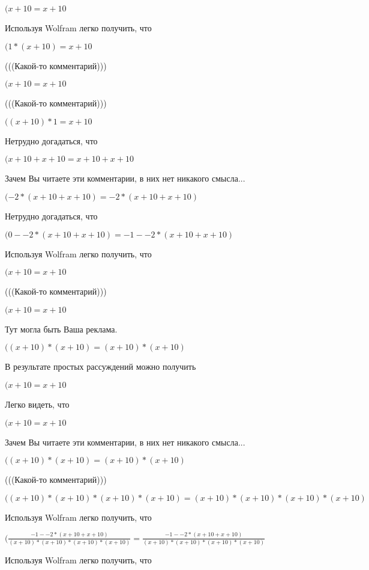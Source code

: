 \documentclass[12pt,a4paper,fleqn]{article}
\theoremstyle{definition}
\begin{document}
$( x  +  10  =  x  +  10 $

Используя Wolfram легко получить, что

$( 1  * ( x  +  10 ) =  x  +  10 $

(((Какой-то комментарий)))

$( x  +  10  =  x  +  10 $

(((Какой-то комментарий)))

$(( x  +  10 ) *  1  =  x  +  10 $

Нетрудно догадаться, что

$( x  +  10  +  x  +  10  =  x  +  10  +  x  +  10 $

Зачем Вы читаете эти комментарии, в них нет никакого смысла...

$( -2  * ( x  +  10  +  x  +  10 ) =  -2  * ( x  +  10  +  x  +  10 )$

Нетрудно догадаться, что

$( 0  -  -2  * ( x  +  10  +  x  +  10 ) =  -1  -  -2  * ( x  +  10  +  x  +  10 )$

Используя Wolfram легко получить, что

$( x  +  10  =  x  +  10 $

(((Какой-то комментарий)))

$( x  +  10  =  x  +  10 $

Тут могла быть Ваша реклама.

$(( x  +  10 ) * ( x  +  10 ) = ( x  +  10 ) * ( x  +  10 )$

В результате простых рассуждений можно получить

$( x  +  10  =  x  +  10 $

Легко видеть, что

$( x  +  10  =  x  +  10 $

Зачем Вы читаете эти комментарии, в них нет никакого смысла...

$(( x  +  10 ) * ( x  +  10 ) = ( x  +  10 ) * ( x  +  10 )$

(((Какой-то комментарий)))

$(( x  +  10 ) * ( x  +  10 ) * ( x  +  10 ) * ( x  +  10 ) = ( x  +  10 ) * ( x  +  10 ) * ( x  +  10 ) * ( x  +  10 )$

Используя Wolfram легко получить, что

$(\frac{ -1  -  -2  * ( x  +  10  +  x  +  10 )}{( x  +  10 ) * ( x  +  10 ) * ( x  +  10 ) * ( x  +  10 )}
 = \frac{ -1  -  -2  * ( x  +  10  +  x  +  10 )}{( x  +  10 ) * ( x  +  10 ) * ( x  +  10 ) * ( x  +  10 )}
$

Используя Wolfram легко получить, что
\end{document}
